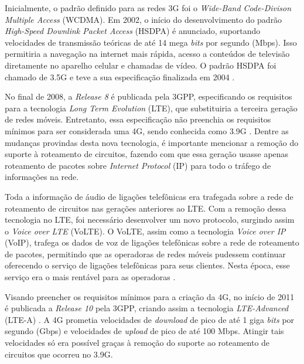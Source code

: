 Inicialmente, o padrão definido para as redes 3G foi o \textit{Wide-Band Code-Divison Multiple Access} (WCDMA).
Em 2002, o início do desenvolvimento do padrão \textit{High-Speed Downlink Packet Access} (HSDPA) é anunciado, suportando velocidades de transmissão teóricas de até 14 mega \textit{bits} por segundo (Mbps). Isso permitiria a navegação na internet mais rápida, acesso a conteúdos de televisão diretamente no aparelho celular e chamadas de vídeo. O padrão HSDPA foi chamado de 3.5G e teve a sua especificação finalizada em 2004 \cite{Lamba2012}.

No final de 2008, a \textit{Release 8} é publicada pela 3GPP, especificando os requisitos para a tecnologia \textit{Long Term Evolution} (LTE), que substituiria a terceira geração de redes móveis.
Entretanto, essa especificação não preenchia os requisitos mínimos para ser considerada uma 4G, sendo conhecida como 3.9G \cite{delperal2018}.
Dentre as mudanças provindas desta nova tecnologia, é importante mencionar a remoção do suporte à roteamento de circuitos, fazendo com que essa geração usasse apenas roteamento de pacotes sobre \textit{Internet Protocol} (IP) para todo o tráfego de informações na rede.

Toda a informação de áudio de ligações telefônicas era trafegada sobre a rede de roteamento de circuitos nas gerações anteriores ao LTE.
Com a remoção dessa tecnologia no LTE, foi necessário desenvolver um novo protocolo, surgindo assim o \textit{Voice over LTE} (VoLTE).
O VoLTE, assim como a tecnologia \textit{Voice over IP} (VoIP), trafega os dados de voz de ligações telefônicas sobre a rede de roteamento de pacotes, permitindo que as operadoras de redes móveis pudessem continuar oferecendo o serviço de ligações telefônicas para seus clientes. Nesta época, esse serviço era o mais rentável para as operadoras \cite{Yi2012}. 

Visando preencher os requisitos mínimos para a criação da 4G, no início de 2011 é publicada a \textit{Release 10} pela 3GPP, criando assim a tecnologia \textit{LTE-Advanced} (LTE-A) \cite{3gpp.21.201}.
A 4G prometia velocidades de \textit{download} de pico de até 1 giga \textit{bits} por segundo (Gbps) e velocidades de \textit{upload} de pico de até 100 Mbps.
Atingir tais velocidades só era possível graças à remoção do suporte ao roteamento de circuitos que ocorreu no 3.9G.

